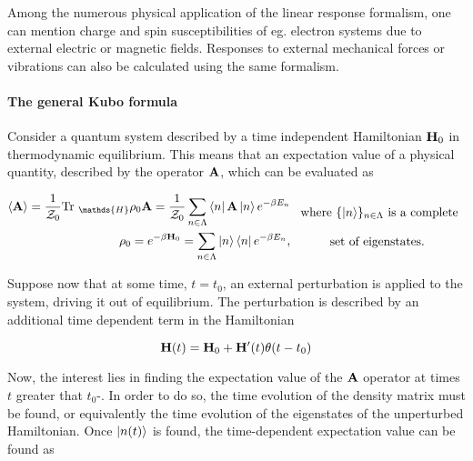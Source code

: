 \documentclass{homework}
\begin{document}
Among the numerous physical application of the linear response formalism, one can mention charge and spin susceptibilities of eg. electron systems due to external electric or magnetic fields. Responses to external mechanical forces or vibrations can also be calculated using the same formalism. \\

\paragraph{\textbf{The general Kubo formula}}

Consider a quantum system described by a time independent Hamiltonian ${\bf H}_0$ in thermodynamic equilibrium. This means that an expectation value of a physical quantity, described by the operator ${\bf A}$, which can be evaluated as 

\begin{equation}
    \begin{split}
        \langle {\bf A} \rangle = \frac{1}{\mathcal{Z}_0} \textnormal{Tr }_{\mathds{H}} \rho_0 {\bf A}  = \frac{1}{\mathcal{Z}_0} \sum_{n \in \Lambda} \bra{n} {{\bf A}} \ket{n} e^{-\beta E_n} \\
        \rho_0 = e^{-\beta {\bf H}_0} = \sum_{n \in \Lambda} \ket{n} \bra{n} e^{-\beta E_n},
    \end{split} \begin{array}{c}
         \textnormal{ where $\{\ket{n}\}_{n \in \Lambda}$ is a complete} \\
         \\
         \textnormal{set of eigenstates}.
    \end{array}
\end{equation}

Suppose now that at some time, $t = t_0$, an external perturbation is applied to the system, driving it out of equilibrium. The perturbation is described by an additional time dependent term in the Hamiltonian 

\begin{equation}
    {\bf H}(t) = {\bf H}_0 + {\bf H}'(t) \theta(t-t_0)
\end{equation}

Now, the interest lies in finding the expectation value of the ${\bf A}$ operator at times $t$ greater that $t_0$-. In order to do so, the time evolution of the density matrix must be found, or equivalently the time evolution of the eigenstates of the unperturbed Hamiltonian. Once $\ket{n(t)}$ is found, the time-dependent expectation value can be found as 
\end{document}
